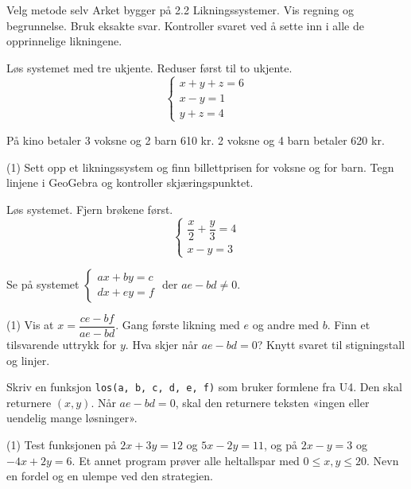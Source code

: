 
\begin{infoboks}{Velg metode selv}
Arket bygger på 2.2 Likningssystemer. Vis regning og begrunnelse. Bruk eksakte svar.
Kontroller svaret ved å sette inn i alle de opprinnelige likningene.
\end{infoboks}


Løs systemet med tre ukjente. Reduser først til to ukjente.
\[ \begin{cases} x + y + z = 6\\ x - y = 1\\ y + z = 4 \end{cases} \]

På kino betaler 3 voksne og 2 barn 610 kr. 2 voksne og 4 barn betaler 620 kr.
\begin{tasks}(1)
  \task Sett opp et likningssystem og finn billettprisen for voksne og for barn.
  \task Tegn linjene i GeoGebra og kontroller skjæringspunktet.
\end{tasks}

Løs systemet. Fjern brøkene først.
\[ \begin{cases} \dfrac{x}{2} + \dfrac{y}{3} = 4\\[2mm] x - y = 3 \end{cases} \]


Se på systemet $\begin{cases} ax + by = c\\ dx + ey = f \end{cases}$ der $ae - bd \neq 0$.
\begin{tasks}(1)
  \task Vis at $x = \dfrac{ce - bf}{ae - bd}$. Gang første likning med $e$ og andre med $b$.
  \task Finn et tilsvarende uttrykk for $y$.
  \task Hva skjer når $ae - bd = 0$? Knytt svaret til stigningstall og linjer.
\end{tasks}

Skriv en funksjon \lstinline[style=laereverk,numbers=none,frame=none]|los(a, b, c, d, e, f)| som bruker formlene fra U4.
Den skal returnere $(x, y)$. Når $ae - bd = 0$, skal den returnere teksten «ingen eller uendelig mange løsninger».
\begin{tasks}(1)
  \task Test funksjonen på $2x + 3y = 12$ og $5x - 2y = 11$, og på $2x - y = 3$ og $-4x + 2y = 6$.
  \task Et annet program prøver alle heltallspar med $0 \le x, y \le 20$. Nevn en fordel og en ulempe ved den strategien.
\end{tasks}

